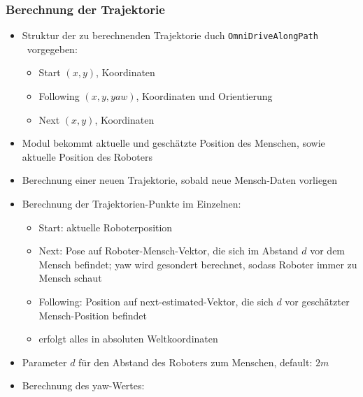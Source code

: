 \subsubsection{Berechnung der Trajektorie}

\begin{itemize}
	\item Struktur der zu berechnenden Trajektorie duch \lstinline{OmniDriveAlongPath} \ vorgegeben:
	\begin{itemize}
		\item Start $(x,y)$, Koordinaten
		\item Following $(x,y,yaw)$, Koordinaten und Orientierung 
		\item Next $(x,y)$, Koordinaten
	\end{itemize}
	\item Modul bekommt aktuelle und geschätzte Position des Menschen, sowie aktuelle Position des Roboters
	\item Berechnung einer neuen Trajektorie, sobald neue Mensch-Daten vorliegen
	\item Berechnung der Trajektorien-Punkte im Einzelnen:
	\begin{itemize}
	  \item Start: aktuelle Roboterposition
	  \item Next: Pose auf Roboter-Mensch-Vektor, die sich im Abstand $d$ vor dem Mensch befindet; yaw wird gesondert berechnet, sodass Roboter immer zu Mensch schaut
	  \item Following: Position auf next-estimated-Vektor, die sich $d$ vor geschätzter Mensch-Position befindet
	  \item erfolgt alles in absoluten Weltkoordinaten
  \end{itemize}
  \item Parameter $d$ für den Abstand des Roboters zum Menschen, default: $2m$
  \item Berechnung des yaw-Wertes: 

\end{itemize}





